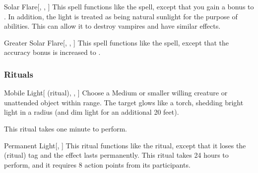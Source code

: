 \lowercase{\hypertarget{spell:Solar Flare}{}}\label{spell:Solar Flare}
\begin{apability}[\nth{4}]{\hypertarget{spell:Solar Flare}{Solar Flare}}[, , ]
This spell functions like the  spell, except that you gain a  bonus to .
In addition, the light is treated as being natural sunlight for the purpose of abilities.
This can allow it to destroy vampires and have similar effects.
\end{apability}
\vspace{0.25em}



\lowercase{\hypertarget{spell:Greater Solar Flare}{}}\label{spell:Greater Solar Flare}
\begin{apability}[\nth{7}]{\hypertarget{spell:Greater Solar Flare}{Greater Solar Flare}}[, , ]
This spell functions like the  spell, except that the accuracy bonus is increased to .
\end{apability}
\vspace{0.25em}



\subsubsection{Rituals}


\lowercase{\hypertarget{spell:Mobile Light}{}}\label{spell:Mobile Light}
\begin{attuneability}[\nth{1}]{\hypertarget{spell:Mobile Light}{Mobile Light}}[ (ritual), , ]
Choose a Medium or smaller willing creature or unattended object within \rngclose range.
The target glows like a torch, shedding bright light in a \areamed radius (and dim light for an additional 20 feet).

This ritual takes one minute to perform.
\end{attuneability}
\vspace{0.25em}



\lowercase{\hypertarget{spell:Permanent Light}{}}\label{spell:Permanent Light}
\begin{apability}[\nth{2}]{\hypertarget{spell:Permanent Light}{Permanent Light}}[, ]
This ritual functions like the  ritual, except that it loses the  (ritual) tag and the effect lasts permanently.
This ritual takes 24 hours to perform, and it requires 8 action points from its participants.
\end{apability}
\vspace{0.25em}


